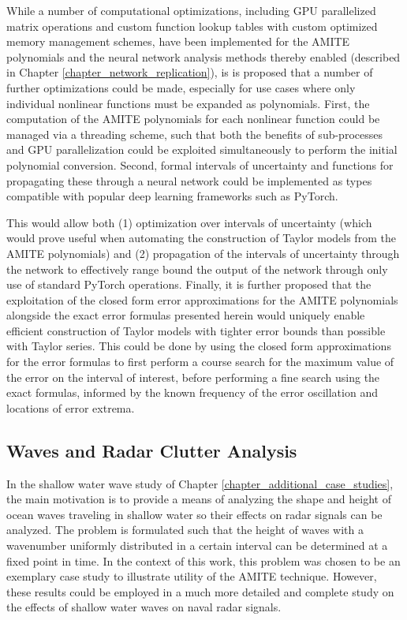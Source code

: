 While a number of computational optimizations, including GPU parallelized matrix operations and custom function lookup tables with custom optimized memory management schemes, have been implemented for the AMITE polynomials and the neural network analysis methods thereby enabled (described in Chapter \ref{chapter_network_replication}), is is proposed that a number of further optimizations could be made, especially for use cases where only individual nonlinear functions must be expanded as polynomials.  First, the computation of the AMITE polynomials for each nonlinear function could be managed via a threading scheme, such that both the benefits of sub-processes and GPU parallelization could be exploited simultaneously to perform the initial polynomial conversion.  Second, formal intervals of uncertainty and functions for propagating these through a neural network could be implemented as types compatible with popular deep learning frameworks such as PyTorch.

This would allow both (1) optimization over intervals of uncertainty (which would prove useful when automating the construction of Taylor models from the AMITE polynomials) and (2) propagation of the intervals of uncertainty through the network to effectively range bound the output of the network through only use of standard PyTorch operations.  Finally, it is further proposed that the exploitation of the closed form error approximations for the AMITE polynomials alongside the exact error formulas presented herein would uniquely enable efficient construction of Taylor models with tighter error bounds than possible with Taylor series.  This could be done by using the closed form approximations for the error formulas to first perform a course search for the maximum value of the error on the interval of interest, before performing a fine search using the exact formulas, informed by the known frequency of the error oscillation and locations of error extrema. 

\subsection{Waves and Radar Clutter Analysis}

In the shallow water wave study of Chapter \ref{chapter_additional_case_studies}, the main motivation is to provide a means of analyzing the shape and height of ocean waves traveling in shallow water so their effects on radar signals can be analyzed.  The problem is formulated such that the height of waves with a wavenumber uniformly distributed in a certain interval can be determined at a fixed point in time.  In the context of this work, this problem was chosen to be an exemplary case study to illustrate utility of the AMITE technique.  However, these results could be employed in a much more detailed and complete study on the effects of shallow water waves on naval radar signals.

